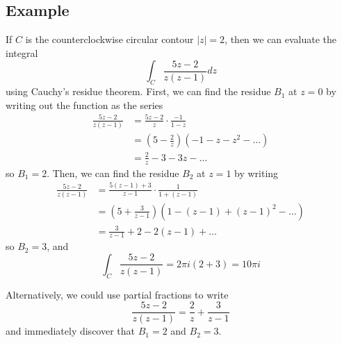 \documentclass{article}
\begin{document}
\subsection{Example}
If $C$ is the counterclockwise circular contour $|z| = 2$, then we can evaluate the integral
\[
	\int_C \frac{5z - 2}{z(z - 1)} dz
\]
using Cauchy's residue theorem. First, we can find the residue $B_1$ at $z = 0$ by writing out the function as the series
\begin{align*}
	\frac{5z - 2}{z(z - 1)}
	&= \frac{5z - 2}{z} \cdot \frac{-1}{1 - z} \\
	&= \left( 5 - \frac{2}{z} \right) (-1 - z - z^2 - \dots) \\
	&= \frac{2}{z} - 3 - 3z - \dots
\end{align*}
so $B_1 = 2$. Then, we can find the residue $B_2$ at $z = 1$ by writing
\begin{align*}
	\frac{5z - 2}{z(z - 1)}
	&= \frac{5(z - 1) + 3}{z - 1} \cdot \frac{1}{1 + (z - 1)} \\
	&= \left( 5 + \frac{3}{z - 1} \right) (1 - (z-1) + (z-1)^2 - \dots) \\
	&= \frac{3}{z - 1} + 2 - 2(z - 1) + \dots
\end{align*}
so $B_2 = 3$, and
\[
	\int_C \frac{5z - 2}{z(z - 1)}
	= 2\pi i(2 + 3)
	= 10\pi i
\]

Alternatively, we could use partial fractions to write
\[	
	\frac{5z - 2}{z(z - 1)} = \frac{2}{z} + \frac{3}{z-1}
\]
and immediately discover that $B_1 = 2$ and $B_2 = 3$.
\end{document}
